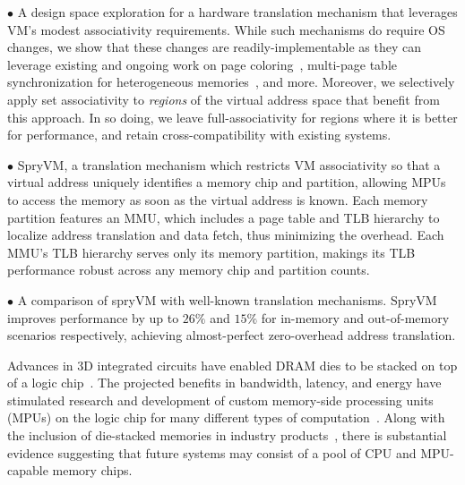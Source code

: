 \noindent $\bullet$ A design space exploration for a hardware translation mechanism that leverages VM's modest associativity requirements. While such mechanisms do require OS changes, we show that these changes are readily-implementable as they can leverage existing and ongoing work on page coloring~\cite{mckusick:design}, multi-page table synchronization for heterogeneous memories~\cite{glisse:hmm}, and more. Moreover, we selectively apply set associativity to {\it regions} of the virtual address space that benefit from this approach. In so doing, we leave full-associativity for regions where it is better for performance, and retain cross-compatibility with existing systems.

\noindent $\bullet$ SpryVM, a translation mechanism which restricts VM associativity so that a virtual address uniquely identifies a memory chip and partition, allowing MPUs to access the memory as soon as the virtual address is known. Each memory partition features an MMU, which includes a page table and TLB hierarchy to localize address translation and data fetch, thus minimizing the overhead. Each MMU's TLB hierarchy serves only its memory partition, makings its TLB performance robust across any memory chip and partition counts.

\noindent $\bullet$ A comparison of spryVM with well-known translation mechanisms. SpryVM improves performance by up to $26\%$ and $15\%$ for in-memory and out-of-memory scenarios respectively, achieving almost-perfect zero-overhead address translation. 



Advances in 3D integrated circuits have enabled DRAM dies to be stacked on top of a logic chip~\cite{hmc, diram, jedec:high}. The projected benefits in bandwidth, latency, and energy have stimulated research and development of custom memory-side processing units (MPUs) on the logic chip for many different types of computation~\cite{ahn:scalable, gao:practical, pugsley:ndc, kim:neurocube, xi:beyond, power:implications, mirzadeh:sort}. Along with the inclusion of die-stacked memories in industry products~\cite{fujitsu:while, reinders:knights}, there is substantial evidence suggesting that future systems may consist of a pool of CPU and MPU-capable memory chips.


